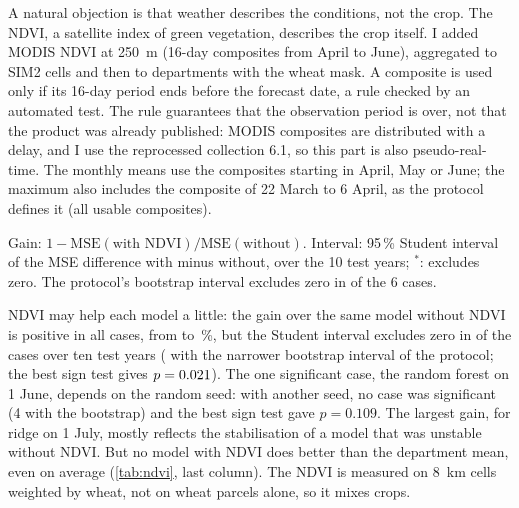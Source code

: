 A natural objection is that weather describes the conditions, not the crop. The NDVI, a satellite index of green vegetation, describes the crop itself. I added MODIS NDVI at 250~m (16-day composites from April to June), aggregated to SIM2 cells and then to departments with the wheat mask. A composite is used only if its 16-day period ends before the forecast date, a rule checked by an automated test. The rule guarantees that the observation period is over, not that the product was already published: MODIS composites are distributed with a delay, and I use the reprocessed collection 6.1, so this part is also pseudo-real-time. The monthly means use the composites starting in April, May or June; the maximum also includes the composite of 22 March to 6 April, as the protocol defines it (all usable composites).

\begin{table}[H]
\centering
\small
\caption{What NDVI adds to each model, training from 2010}
\label{tab:ndvi}
\begin{threeparttable}

\begin{tablenotes}\footnotesize
\item Gain: $1 - \mathrm{MSE}(\text{with NDVI})/\mathrm{MSE}(\text{without})$. Interval: 95\,\% Student interval of the MSE difference with minus without, over the 10 test years; $^*$: excludes zero. The protocol's bootstrap interval excludes zero in \NdviSigBoot{} of the 6 cases.
\end{tablenotes}
\end{threeparttable}
\end{table}

NDVI may help each model a little: the gain over the same model without NDVI is positive in all \NdviTot{} cases, from \NdviGainMin{} to \NdviGainMax\,\%, but the Student interval excludes zero in \NdviSig{} of the \NdviTot{} cases over ten test years (\NdviSigBoot{} with the narrower bootstrap interval of the protocol; the best sign test gives $p = 0.021$). The one significant case, the random forest on 1 June, depends on the random seed: with another seed, no case was significant (4 with the bootstrap) and the best sign test gave $p = 0.109$. The largest gain, for ridge on 1 July, mostly reflects the stabilisation of a model that was unstable without NDVI. But no model with NDVI does better than the department mean, even on average (\cref{tab:ndvi}, last column). The NDVI is measured on 8~km cells weighted by wheat, not on wheat parcels alone, so it mixes crops.


